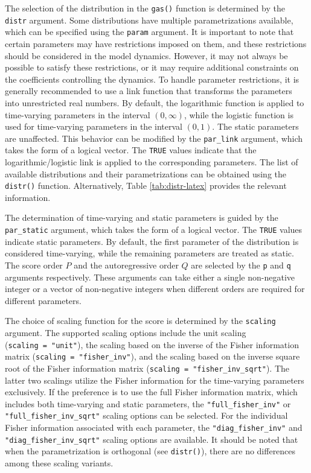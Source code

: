 The selection of the distribution in the \texttt{gas()} function is determined by the \texttt{distr} argument. Some distributions have multiple parametrizations available, which can be specified using the \texttt{param} argument. It is important to note that certain parameters may have restrictions imposed on them, and these restrictions should be considered in the model dynamics. However, it may not always be possible to satisfy these restrictions, or it may require additional constraints on the coefficients controlling the dynamics. To handle parameter restrictions, it is generally recommended to use a link function that transforms the parameters into unrestricted real numbers. By default, the logarithmic function is applied to time-varying parameters in the interval \((0, \infty)\), while the logistic function is used for time-varying parameters in the interval \((0, 1)\). The static parameters are unaffected. This behavior can be modified by the \texttt{par\_link} argument, which takes the form of a logical vector. The \texttt{TRUE} values indicate that the logarithmic/logistic link is applied to the corresponding parameters. The list of available distributions and their parametrizations can be obtained using the \texttt{distr()} function. Alternatively, Table \ref{tab:distr-latex} provides the relevant information.

The determination of time-varying and static parameters is guided by the \texttt{par\_static} argument, which takes the form of a logical vector. The \texttt{TRUE} values indicate static parameters. By default, the first parameter of the distribution is considered time-varying, while the remaining parameters are treated as static. The score order \(P\) and the autoregressive order \(Q\) are selected by the \texttt{p} and \texttt{q} arguments respectively. These arguments can take either a single non-negative integer or a vector of non-negative integers when different orders are required for different parameters.

The choice of scaling function for the score is determined by the \texttt{scaling} argument. The supported scaling options include the unit scaling (\texttt{scaling\ =\ "unit"}), the scaling based on the inverse of the Fisher information matrix (\texttt{scaling\ =\ "fisher\_inv"}), and the scaling based on the inverse square root of the Fisher information matrix (\texttt{scaling\ =\ "fisher\_inv\_sqrt"}). The latter two scalings utilize the Fisher information for the time-varying parameters exclusively. If the preference is to use the full Fisher information matrix, which includes both time-varying and static parameters, the \texttt{"full\_fisher\_inv"} or \texttt{"full\_fisher\_inv\_sqrt"} scaling options can be selected. For the individual Fisher information associated with each parameter, the \texttt{"diag\_fisher\_inv"} and \texttt{"diag\_fisher\_inv\_sqrt"} scaling options are available. It should be noted that when the parametrization is orthogonal (see \texttt{distr()}), there are no differences among these scaling variants.

